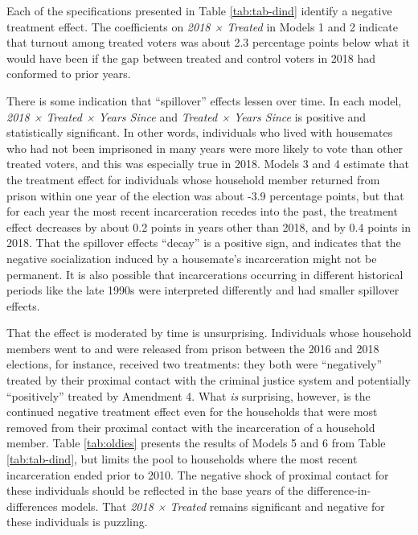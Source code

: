 \documentclass[
  12pt,
]{article}
\begin{document}
Each of the specifications presented in Table \ref{tab:tab-dind} identify a negative treatment effect. The coefficients on \emph{2018 × Treated} in Models 1 and 2 indicate that turnout among treated voters was about 2.3 percentage points below what it would have been if the gap between treated and control voters in 2018 had conformed to prior years.

There is some indication that ``spillover'' effects lessen over time. In each model, \emph{2018 × Treated × Years Since} and \emph{Treated × Years Since} is positive and statistically significant. In other words, individuals who lived with housemates who had not been imprisoned in many years were more likely to vote than other treated voters, and this was especially true in 2018. Models 3 and 4 estimate that the treatment effect for individuals whose household member returned from prison within one year of the election was about -3.9 percentage points, but that for each year the most recent incarceration recedes into the past, the treatment effect decreases by about 0.2 points in years other than 2018, and by 0.4 points in 2018. That the spillover effects ``decay'' is a positive sign, and indicates that the negative socialization induced by a housemate's incarceration might not be permanent. It is also possible that incarcerations occurring in different historical periods like the late 1990s were interpreted differently and had smaller spillover effects.

That the effect is moderated by time is unsurprising. Individuals whose household members went to and were released from prison between the 2016 and 2018 elections, for instance, received two treatments: they both were ``negatively'' treated by their proximal contact with the criminal justice system and potentially ``positively'' treated by Amendment 4. What \emph{is} surprising, however, is the continued negative treatment effect even for the households that were most removed from their proximal contact with the incarceration of a household member. Table \ref{tab:oldies} presents the results of Models 5 and 6 from Table \ref{tab:tab-dind}, but limits the pool to households where the most recent incarceration ended prior to 2010. The negative shock of proximal contact for these individuals should be reflected in the base years of the difference-in-differences models. That \emph{2018 × Treated} remains significant and negative for these individuals is puzzling.

\begin{singlespace}

\end{singlespace}
\end{document}
